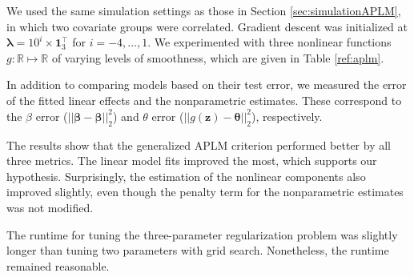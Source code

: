 \documentclass[12pt,letterpaper]{article}
\begin{document}
We used the same simulation settings as those in Section \ref{sec:simulationAPLM}, in which two covariate groups were correlated. Gradient descent was initialized at $\boldsymbol{\lambda} = 10^i \times \boldsymbol 1_3^\top$ for $i=-4, ..., 1$. We experimented with three nonlinear functions $g:\mathbb{R} \mapsto \mathbb{R}$ of varying levels of smoothness, which are given in Table \ref{ref:aplm}.

In addition to comparing models based on their test error, we measured the error of the fitted linear effects and the nonparametric estimates. These correspond to the $\beta$ error ($||\boldsymbol \beta - \hat {\boldsymbol \beta}||_2^2$) and $\theta$ error ($|| g(\boldsymbol z) - \boldsymbol \theta ||_2^2$), respectively.

The results show that the generalized APLM criterion performed better by all three metrics. The linear model fits improved the most, which supports our hypothesis. Surprisingly, the estimation of the nonlinear components also improved slightly, even though the penalty term for the nonparametric estimates was not modified.

The runtime for tuning the three-parameter regularization problem was slightly longer than tuning two parameters with grid search. Nonetheless, the runtime remained reasonable.
\end{document}

